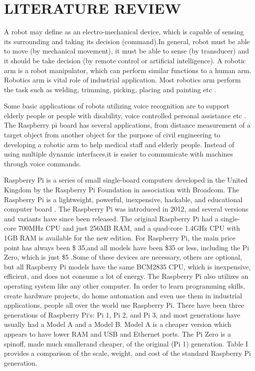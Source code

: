 \chapter{LITERATURE REVIEW}
A robot may define as an electro-mechanical device, which
is capable of sensing its surrounding and taking its decision
(command).In general, robot must be able to move (by
mechanical movement), it must be able to sense (by
transducer) and it should be take decision (by remote
control or artificial intelligence). A robotic arm is a robot
manipulator, which can perform similar functions to a
human arm.
Robotics arm is vital role of industrial application. Most
robotics arm perform the task such as welding, trimming,
picking, placing and painting etc \cite{r1}.

Some    basic    applications    of    robots    utilizing    voice recognition  are  to  support  elderly  people  or  people  with disability,  voice  controlled  personal  assistance  etc . The   Raspberry   pi   board   has   several   applications,   from distance measurement of a target object from another object for  the  purpose  of  civil  engineering  to  developing  a robotic arm to help medical staff and elderly people. Instead of   using   multiple   dynamic   interfaces,it   is   easier   to communicate with machines through voice commands\cite{r2}.

Raspberry Pi is a series of small single-board computers developed  in  the  United  Kingdom  by  the  Raspberry  Pi Foundation in association with Broadcom. The Raspberry Pi is   a   lightweight,   powerful,   inexpensive,   hackable,   and educational  computer board  .  The  Raspberry  Pi was  introduced  in  2012,  and  several  versions  and  variants have  since  been  released.  The  original  Raspberry  Pi  had  a single-core  700MHz  CPU  and  just  256MB  RAM,  and  a quad-core 1.4GHz CPU with 1GB RAM is available for the new  edition.  For  Raspberry  Pi,  the  main  price  point  has always  been  \$ 35,and  all  models  have  been  \$35  or  less, including the Pi Zero, which is just \$5 .Some of these  devices  are  necessary,  others  are  optional,  but  all Raspberry Pi models have the same BCM2835 CPU, which is  inexpensive,  efficient,  and  does  not  consume  a  lot  of energy. The Raspberry Pi also utilizes an operating system like any other computer. In  order  to  learn  programming  skills,  create  hardware projects,   do   home   automation   and   even   use   them   in industrial   applications,   people   all   over   the   world   use Raspberry   Pi.   There   have   been   three   generations   of Raspberry  Pi`s:  Pi  1,  Pi  2,  and  Pi  3,  and  most  generations have  usually had a  Model  A and a  Model  B. Model  A  is a cheaper version which appears to have lower RAM and USB and  Ethernet  ports.  The  Pi  Zero  is  a  spinoff,  made  much smallerand cheaper, of the original (Pi 1) generation. Table I provides a comparison of the scale, weight, and cost of the standard Raspberry Pi generation\cite{r2}.

